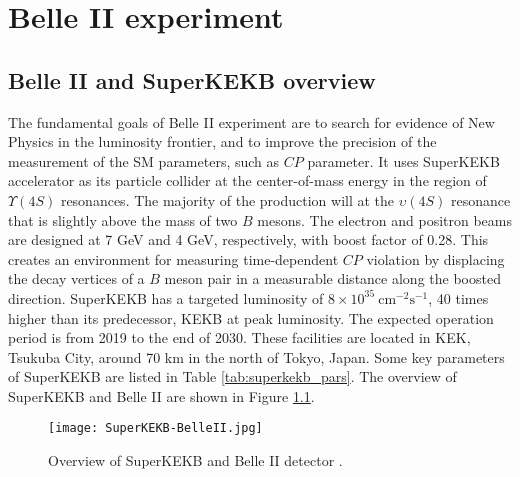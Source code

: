 \chapter{Belle II experiment}
\section{Belle II and SuperKEKB overview}
The fundamental goals of Belle II experiment are to search for evidence of New Physics in the luminosity frontier, and to improve the precision of the measurement of the SM parameters, such as $CP$ parameter.\cite{b2book} It uses SuperKEKB accelerator as its particle collider at the center-of-mass energy in the region of $\Upsilon(4S)$ resonances. The majority of the production will at the $\upsilon(4S)$ resonance that is slightly above the mass of two $B$ mesons. The electron and positron beams are designed at 7 GeV and 4 GeV, respectively, with boost factor of 0.28. This creates an environment for measuring time-dependent $CP$ violation by displacing the decay vertices of a $B$ meson pair in a measurable distance along the boosted direction. SuperKEKB has a targeted luminosity of $8\times 10^{35}\: \text{cm}^{-2} \text{s}^{-1}$, 40 times higher than its predecessor, KEKB at peak luminosity. The expected operation period is from 2019 to the end of 2030. These facilities are located in KEK, Tsukuba City, around 70 km in the north of Tokyo, Japan. Some key parameters of SuperKEKB are listed in Table \ref{tab:superkekb_pars}. The overview of SuperKEKB and Belle II are shown in Figure \ref{fig:superkekb_belle2}.

\begin{figure}
	\centering 
	\texttt{[image: SuperKEKB-BelleII.jpg]}
	\caption{Overview of SuperKEKB and Belle II detector \cite{Abe:2010gxa}.}
	\label{fig:superkekb_belle2}
\end{figure}

